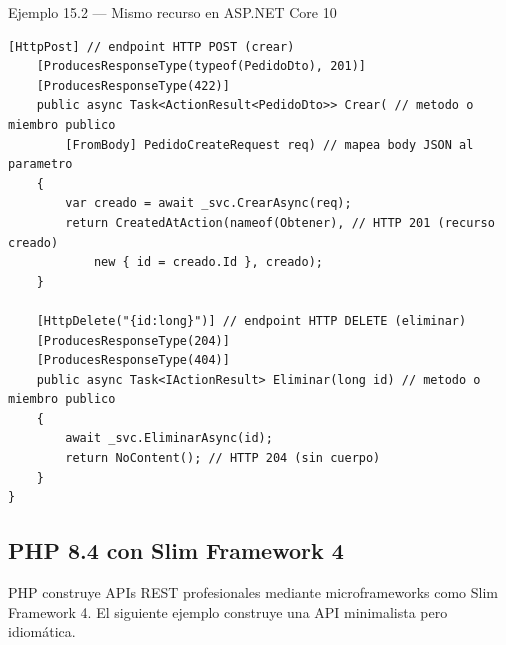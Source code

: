\begin{cajaejemplo}{Ejemplo 15.2 --- Mismo recurso en ASP.NET Core 10}
\begin{lstlisting}[style=cs,caption={PedidosController.cs},label=lst:15.4]
    [HttpPost] // endpoint HTTP POST (crear)
    [ProducesResponseType(typeof(PedidoDto), 201)]
    [ProducesResponseType(422)]
    public async Task<ActionResult<PedidoDto>> Crear( // metodo o miembro publico
        [FromBody] PedidoCreateRequest req) // mapea body JSON al parametro
    {
        var creado = await _svc.CrearAsync(req);
        return CreatedAtAction(nameof(Obtener), // HTTP 201 (recurso creado)
            new { id = creado.Id }, creado);
    }

    [HttpDelete("{id:long}")] // endpoint HTTP DELETE (eliminar)
    [ProducesResponseType(204)]
    [ProducesResponseType(404)]
    public async Task<IActionResult> Eliminar(long id) // metodo o miembro publico
    {
        await _svc.EliminarAsync(id);
        return NoContent(); // HTTP 204 (sin cuerpo)
    }
}
\end{lstlisting}
\end{cajaejemplo}

\subsection{PHP 8.4 con Slim Framework 4}

PHP construye APIs REST profesionales mediante microframeworks
como Slim Framework 4. El siguiente ejemplo construye una API
minimalista pero idiomática.


